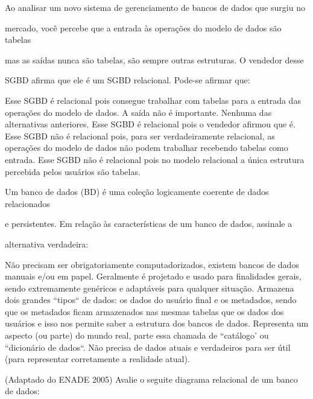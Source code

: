 \documentclass[12pt, addpoints]{exam}
\begin{document}
\begin{questions}
\question

Ao analisar um novo sistema de gerenciamento de bancos de dados que surgiu no

mercado, você percebe que a entrada às operações do modelo de dados são tabelas

mas as saídas nunca são tabelas, são sempre outras estruturas. O vendedor desse

SGBD afirma que ele é um SGBD relacional. Pode-se afirmar que:


\begin{choices}
\choice Esse SGBD é relacional pois consegue trabalhar com tabelas para a entrada das operações do modelo de dados. A saída não é importante.
\choice Nenhuma das alternativas anteriores.
\choice Esse SGBD é relacional pois o vendedor afirmou que é.
\choice Esse SGBD não é relacional pois, para ser verdadeiramente relacional, as operações do modelo de dados não podem trabalhar recebendo tabelas como entrada.
\choice Esse SGBD não é relacional pois no modelo relacional a única estrutura percebida pelos usuários são tabelas.
\end{choices}

\question

Um banco de dados (BD) é uma coleção logicamente coerente de dados relacionados

e persistentes. Em relação às características de um banco de dados, assinale a

alternativa verdadeira:
\begin{choices}
\choice Não precisam ser obrigatoriamente computadorizados, existem bancos de dados manuais e/ou em papel.
\choice Geralmente é projetado e usado para finalidades gerais, sendo extremamente genéricos e adaptáveis para qualquer situação.
\choice Armazena dois grandes ``tipos`` de dados: os dados do usuário final e os metadados, sendo que os metadados ficam armazenados nas mesmas tabelas que os dados dos usuários e isso nos permite saber a estrutura dos bancos de dados.
\choice Representa um aspecto (ou parte) do mundo real, parte essa chamada de ``catálogo' ou ``dicionário de dados``.
\choice Não precisa de dados atuais e verdadeiros para ser útil (para representar corretamente a realidade atual).
\end{choices}

\question

(Adaptado do ENADE 2005) Avalie o seguite diagrama relacional de um banco de dados:

\begin{figure}[H]


\end{figure}
\end{questions}
\end{document}
